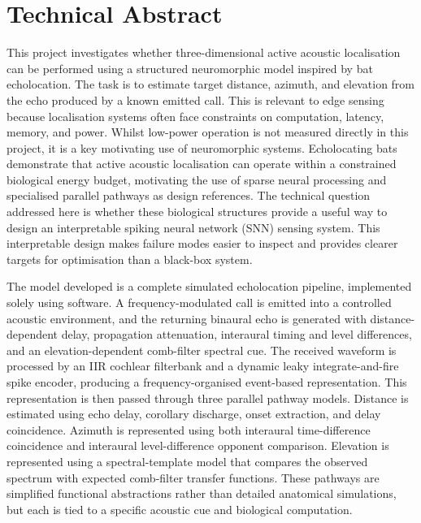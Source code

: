 \chapter*{Technical Abstract}

This project investigates whether three-dimensional active acoustic localisation can be performed using a structured neuromorphic model inspired by bat echolocation. The task is to estimate target distance, azimuth, and elevation from the echo produced by a known emitted call. This is relevant to edge sensing because localisation systems often face constraints on computation, latency, memory, and power. Whilst low-power operation is not measured directly in this project, it is a key motivating use of neuromorphic systems. Echolocating bats demonstrate that active acoustic localisation can operate within a constrained biological energy budget, motivating the use of sparse neural processing and specialised parallel pathways as design references. The technical question addressed here is whether these biological structures provide a useful way to design an interpretable spiking neural network (SNN) sensing system. This interpretable design makes failure modes easier to inspect and provides clearer targets for optimisation than a black-box system.

The model developed is a complete simulated echolocation pipeline, implemented solely using software. A frequency-modulated call is emitted into a controlled acoustic environment, and the returning binaural echo is generated with distance-dependent delay, propagation attenuation, interaural timing and level differences, and an elevation-dependent comb-filter spectral cue. The received waveform is processed by an IIR cochlear filterbank and a dynamic leaky integrate-and-fire spike encoder, producing a frequency-organised event-based representation. This representation is then passed through three parallel pathway models. Distance is estimated using echo delay, corollary discharge, onset extraction, and delay coincidence. Azimuth is represented using both interaural time-difference coincidence and interaural level-difference opponent comparison. Elevation is represented using a spectral-template model that compares the observed spectrum with expected comb-filter transfer functions. These pathways are simplified functional abstractions rather than detailed anatomical simulations, but each is tied to a specific acoustic cue and biological computation.

